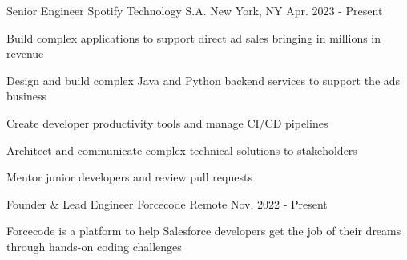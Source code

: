 

\begin{cventries}

  \cventry
    {Senior Engineer} %
    {Spotify Technology S.A.} %
    {New York, NY} %
    {Apr. 2023 - Present} %
    {
      \begin{cvitems} 
        \item {Build complex applications to support direct ad sales bringing in millions in revenue}
        \item {Design and build complex Java and Python backend services to support the ads business}
        \item {Create developer productivity tools and manage CI/CD pipelines}
        \item {Architect and communicate complex technical solutions to stakeholders}
        \item {Mentor junior developers and review pull requests}
      \end{cvitems}
    }

  \cventry
    {Founder \& Lead Engineer} %
    {Forcecode} %
    {Remote} %
    {Nov. 2022 - Present} %
    {
      \begin{cvitems} %
        \item {Forcecode is a platform to help Salesforce developers get the job of their dreams through hands-on coding challenges}
      \end{cvitems}
    }



\end{cventries}
